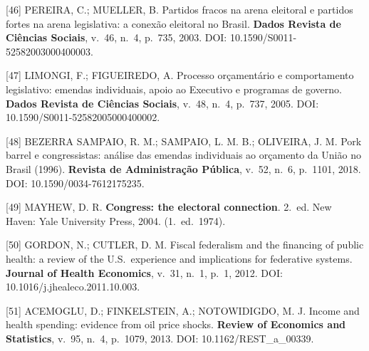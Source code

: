 \documentclass[12pt,a4paper,oneside]{article}
\begin{document}
\begin{singlespace}
\noindent\hangindent=1.25cm\label{ref:pereira-mueller}
[46] PEREIRA, C.; MUELLER, B. Partidos fracos na arena eleitoral
e partidos fortes na arena legislativa: a conex\~ao eleitoral no
Brasil. \textbf{Dados \textemdash{} Revista de Ci\^encias Sociais},
v.\ 46, n.\ 4, p.\ 735, 2003. DOI:
10.1590/S0011-52582003000400003.
\par\smallskip

\noindent\hangindent=1.25cm\label{ref:limongi}
[47] LIMONGI, F.; FIGUEIREDO, A. Processo or\c{c}ament\'ario e
comportamento legislativo: emendas individuais, apoio ao Executivo
e programas de governo. \textbf{Dados \textemdash{} Revista de
Ci\^encias Sociais}, v.\ 48, n.\ 4, p.\ 737, 2005.
DOI: 10.1590/S0011-52582005000400002.
\par\smallskip

\noindent\hangindent=1.25cm\label{ref:bezerra}
[48] BEZERRA SAMPAIO, R. M.; SAMPAIO, L. M. B.; OLIVEIRA, J. M.
Pork barrel e congressistas: an\'alise das emendas individuais
ao or\c{c}amento da Uni\~ao no Brasil (1996).
\textbf{Revista de Administra\c{c}\~ao P\'ublica}, v.\ 52, n.\ 6,
p.\ 1101, 2018. DOI: 10.1590/0034-7612175235.
\par\smallskip

\noindent\hangindent=1.25cm\label{ref:mayhew}
[49] MAYHEW, D. R. \textbf{Congress: the electoral connection}.
2.\ ed. New Haven: Yale University Press, 2004. (1.\ ed.\ 1974).
\par\smallskip

\noindent\hangindent=1.25cm\label{ref:gordon-cutler}
[50] GORDON, N.; CUTLER, D. M. Fiscal federalism and the
financing of public health: a review of the U.S.\ experience and
implications for federative systems. \textbf{Journal of Health
Economics}, v.\ 31, n.\ 1, p.\ 1, 2012. DOI:
10.1016/j.jhealeco.2011.10.003.
\par\smallskip

\noindent\hangindent=1.25cm\label{ref:acemoglu}
[51] ACEMOGLU, D.; FINKELSTEIN, A.; NOTOWIDIGDO, M. J. Income
and health spending: evidence from oil price shocks.
\textbf{Review of Economics and Statistics}, v.\ 95, n.\ 4,
p.\ 1079, 2013. DOI: 10.1162/REST\_a\_00339.
\par\smallskip


\end{singlespace}
\end{document}
